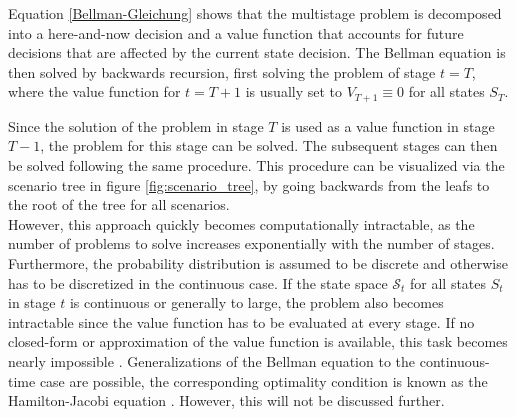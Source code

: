 Equation \ref{Bellman-Gleichung} shows that the multistage problem is decomposed into a here-and-now decision and a value function that accounts for future decisions that are affected by the current state decision.
The Bellman equation is then solved by backwards recursion, first solving the problem of stage $t=T$, where the value function for $t=T+1$ is usually set to $V_{T+1} \equiv 0$ for all states $S_T$.

Since the solution of the problem in stage $T$ is used as a value function in stage $T-1$, the problem for this stage can be solved.
The subsequent stages can then be solved following the same procedure.
This procedure can be visualized via the scenario tree in figure \ref{fig:scenario_tree}, by going backwards from the leafs to the root of the tree for all scenarios. \\
However, this approach quickly becomes computationally intractable, as the number of problems to solve increases exponentially with the number of stages. Furthermore, the probability distribution is assumed to be discrete and otherwise has to be discretized in the continuous case.
If the state space $\mathcal{S}_t$ for all states $S_t$ in stage $t$ is continuous or generally to large, the problem also becomes intractable since the value function has to be evaluated at every stage. 
If no closed-form or approximation of the value function is available, this task becomes nearly impossible \cite{Powell_solving_Curses_of_Dimensionality}. 
Generalizations of the Bellman equation to the continuous-time case are possible, the corresponding optimality condition is known as the Hamilton-Jacobi equation \cite{continous_time_stochastic_control}.
However, this will not be discussed further.

